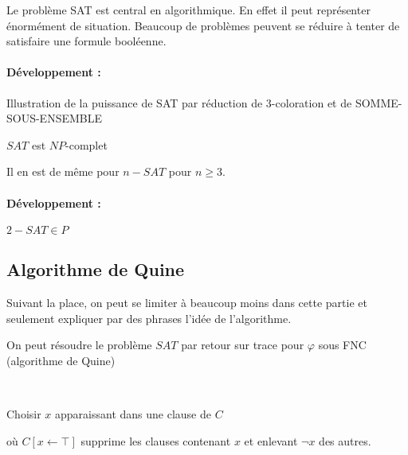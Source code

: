 \begin{appl}
	Le problème SAT est central en algorithmique. En effet il peut représenter énormément de situation. Beaucoup de problèmes peuvent se réduire à tenter de satisfaire une formule booléenne.
\end{appl}

\paragraph{Développement : } Illustration de la puissance de SAT par réduction de 3-coloration et de SOMME-SOUS-ENSEMBLE

\begin{theorem}[Cook]
	$SAT$ est $NP$-complet
\end{theorem}

Il en est de même pour $n-SAT$ pour $n \geq 3$.

\paragraph{Développement :} $2-SAT \in P$

\subsection{Algorithme de Quine}

\begin{com}
	Suivant la place, on peut se limiter à beaucoup moins dans cette partie et seulement expliquer par des phrases l'idée de l'algorithme.
\end{com}

\begin{idee}
	On peut résoudre le problème $SAT$ par retour sur trace pour $\varphi$ sous FNC (algorithme de Quine)
\end{idee}

\begin{algo}[Quine]\\
	\begin{algorithm}[H]
		\caption{$Quine(C)$}
			{}
			{}
		Choisir $x$ apparaissant dans une clause de $C$\\
			{}
			{}
	\end{algorithm}
	où $C[x \gets \top]$ supprime les clauses contenant $x$ et enlevant $\neg x$ des autres.
\end{algo}

